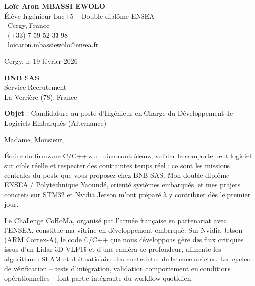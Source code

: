 \documentclass[a4paper,11pt]{article}
\begin{document}
\noindent
\begin{minipage}[t]{0.5\textwidth}
    \textbf{Loïc Aron MBASSI EWOLO}\\
    Élève-Ingénieur Bac+5 -- Double diplôme ENSEA\\[3pt]
    \faMapMarker\ Cergy, France\\
    \faPhone\ (+33) 7 59 52 33 98\\
    \faEnvelope\ \href{mailto:loicaron.mbassiewolo@ensea.fr}{loicaron.mbassiewolo@ensea.fr}
\end{minipage}
\hfill
\begin{minipage}[t]{0.4\textwidth}
    \raggedleft
    Cergy, le 19 février 2026
\end{minipage}

\vspace{1.2cm}

\hfill
\begin{minipage}[t]{0.5\textwidth}
    \raggedleft
    \textbf{BNB SAS}\\
    Service Recrutement\\
    La Verrière (78), France
\end{minipage}

\vspace{1cm}

\noindent\textbf{Objet :} Candidature au poste d'Ingénieur en Charge du Développement de Logiciels Embarqués (Alternance)

\vspace{0.8cm}

Madame, Monsieur,

Écrire du firmware C/C++ sur microcontrôleurs, valider le comportement logiciel sur cible réelle et respecter des contraintes temps réel : ce sont les missions centrales du poste que vous proposez chez BNB SAS. Mon double diplôme ENSEA / Polytechnique Yaoundé, orienté systèmes embarqués, et mes projets concrets sur STM32 et Nvidia Jetson m'ont préparé à y contribuer dès le premier jour.

Le Challenge CoHoMa, organisé par l'armée française en partenariat avec l'ENSEA, constitue ma vitrine en développement embarqué. Sur Nvidia Jetson (ARM Cortex-A), le code C/C++ que nous développons gère des flux critiques issus d'un Lidar 3D VLP16 et d'une caméra de profondeur, alimente les algorithmes SLAM et doit satisfaire des contraintes de latence strictes. Les cycles de vérification -- tests d'intégration, validation comportement en conditions opérationnelles -- font partie intégrante du workflow quotidien.
\end{document}
